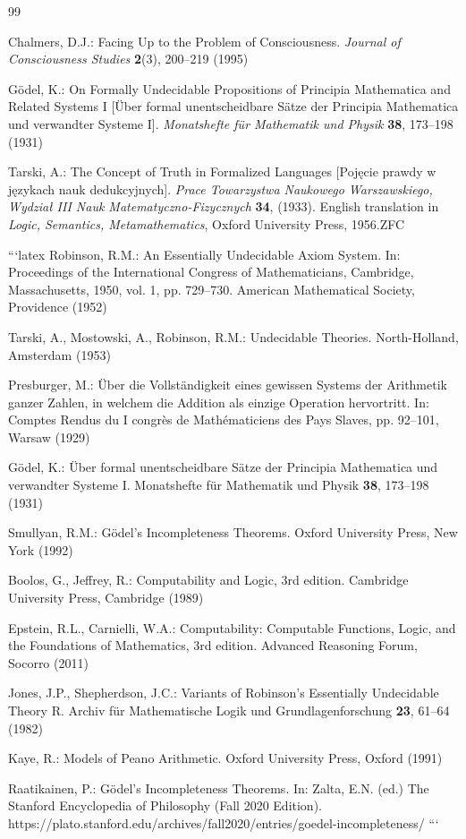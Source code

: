 \documentclass[runningheads]{llncs}
\begin{document}
\begin{thebibliography}{99}

Chalmers, D.J.: Facing Up to the Problem of Consciousness. \textit{Journal of Consciousness Studies} \textbf{2}(3), 200--219 (1995)
	
Gödel, K.: On Formally Undecidable Propositions of Principia Mathematica and Related Systems I [Über formal unentscheidbare Sätze der Principia Mathematica und verwandter Systeme I]. \textit{Monatshefte für Mathematik und Physik} \textbf{38}, 173--198 (1931)

Tarski, A.: The Concept of Truth in Formalized Languages [Pojęcie prawdy w językach nauk dedukcyjnych]. \textit{Prace Towarzystwa Naukowego Warszawskiego, Wydział III Nauk Matematyczno-Fizycznych} \textbf{34}, (1933). English translation in \textit{Logic, Semantics, Metamathematics}, Oxford University Press, 1956.ZFC

```latex
Robinson, R.M.: An Essentially Undecidable Axiom System. In: Proceedings of the International Congress of Mathematicians, Cambridge, Massachusetts, 1950, vol. 1, pp. 729--730. American Mathematical Society, Providence (1952)

Tarski, A., Mostowski, A., Robinson, R.M.: Undecidable Theories. North-Holland, Amsterdam (1953)

Presburger, M.: Über die Vollständigkeit eines gewissen Systems der Arithmetik ganzer Zahlen, in welchem die Addition als einzige Operation hervortritt. In: Comptes Rendus du I congrès de Mathématiciens des Pays Slaves, pp. 92--101, Warsaw (1929)

Gödel, K.: Über formal unentscheidbare Sätze der Principia Mathematica und verwandter Systeme I. Monatshefte für Mathematik und Physik \textbf{38}, 173--198 (1931)

Smullyan, R.M.: Gödel's Incompleteness Theorems. Oxford University Press, New York (1992)

Boolos, G., Jeffrey, R.: Computability and Logic, 3rd edition. Cambridge University Press, Cambridge (1989)

Epstein, R.L., Carnielli, W.A.: Computability: Computable Functions, Logic, and the Foundations of Mathematics, 3rd edition. Advanced Reasoning Forum, Socorro (2011)

Jones, J.P., Shepherdson, J.C.: Variants of Robinson's Essentially Undecidable Theory R. Archiv für Mathematische Logik und Grundlagenforschung \textbf{23}, 61--64 (1982)

Kaye, R.: Models of Peano Arithmetic. Oxford University Press, Oxford (1991)

Raatikainen, P.: Gödel's Incompleteness Theorems. In: Zalta, E.N. (ed.) The Stanford Encyclopedia of Philosophy (Fall 2020 Edition). https://plato.stanford.edu/archives/fall2020/entries/goedel-incompleteness/
```
	
\end{thebibliography}
\end{document}

